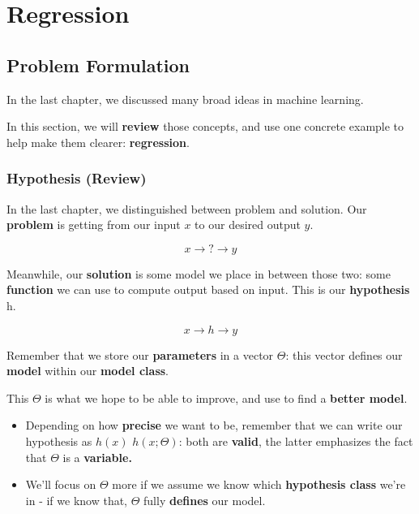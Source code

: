 \setcounter{chapter}{1} %

\chapter{Regression}

\label{chap:regression}

\section{Problem Formulation}

    In the last chapter, we discussed many broad ideas in machine learning. 
    
    In this section, we will \textbf{review} those concepts, and use one concrete example to help make them clearer: \textbf{regression}.
    
    \subsection{Hypothesis (Review)}
    
        In the last chapter, we distinguished between problem and solution. Our \textbf{problem} is getting from our input $x$ to our desired output $y$.
        
        $$ x \rightarrow \boxed{?} \rightarrow y $$
        
        Meanwhile, our \textbf{solution} is some model we place in between those two: some \textbf{function} we can use to compute output based on input. This is our \textbf{hypothesis} h.
        
        $$ x \rightarrow \boxed{h} \rightarrow y $$
        
        Remember that we store our \textbf{parameters} in a vector $\Theta$: this vector defines our \textbf{model} within our \textbf{model class}.
        
        This $\Theta$ is what we hope to be able to improve, and use to find a \textbf{better model}.

        \begin{itemize}
            \item Depending on how \textbf{precise} we want to be, remember that we can write our hypothesis as $h(x)$  $h(x; \Theta)$: both are \textbf{valid}, the latter emphasizes the fact that $\Theta$ is a \textbf{variable.}
            \item We'll focus on $\Theta$ more if we assume we know which \textbf{hypothesis class} we're in - if we know that, $\Theta$ fully \textbf{defines} our model.
        \end{itemize}
        
